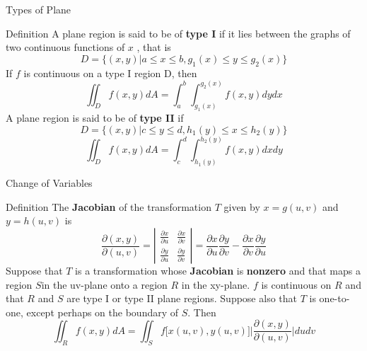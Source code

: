 \documentclass{beamer}
\begin{document}
\begin{frame}{Types of Plane}
    \begin{block}{Definition}
        A plane region is said to be of \textbf{type I} if it lies between the graphs of two continuous functions of $x$ , that is
        \begin{equation*}
            D=\{(x,y)|a\leq x\leq b, g_1(x)\leq y\leq g_2(x)\}
        \end{equation*}
        If $f$ is continuous on a type I region D, then
        \begin{equation*}
            \iint_Df(x,y)dA=\int_a^b\int_{g_1(x)}^{g_2(x)}f(x,y)dydx
        \end{equation*}
        A plane region is said to be of \textbf{type II} if
        \begin{equation*}
            D=\{(x,y)|c\leq y\leq d, h_1(y)\leq x\leq h_2(y)\}
        \end{equation*}
        \begin{equation*}
            \iint_Df(x,y)dA=\int_c^d\int_{h_1(y)}^{h_2(y)}f(x,y)dxdy
        \end{equation*}
    \end{block}
\end{frame}
\begin{frame}{Change of Variables}
    \begin{block}{Definition}
        The \textbf{Jacobian} of the transformation $T$ given by $x=g(u,v)$ and $y=h(u,v)$ is 
        \begin{equation*}
            \dfrac{\partial(x,y)}{\partial(u,v)}=
            \left|\begin{array}{cc}
                \frac{\partial x}{\partial u} & \frac{\partial x}{\partial v} \\
                \frac{\partial y}{\partial u} & \frac{\partial y}{\partial v}
            \end{array}\right|
            =\frac{\partial x}{\partial u}\frac{\partial y}{\partial v}-\frac{\partial x}{\partial v}\frac{\partial y}{\partial u}
        \end{equation*}
        Suppose that $T$ is a transformation whose \textbf{Jacobian} is \textbf{nonzero} and that maps a region $S$in the uv-plane onto a region $R$ in the xy-plane. $f$ is continuous on $R$ and that $R$ and $S$ are type I or type II plane regions. Suppose also that $T$ is one-to-one, except perhaps on the
boundary of $S$. Then
        \begin{equation*}
            \iint_Rf(x,y)dA=\iint_Sf\big[x(u,v),y(u,v)\big]\Big| \dfrac{\partial(x,y)}{\partial(u,v)}\Big|dudv
        \end{equation*}
    \end{block}
\end{frame}
\end{document}
